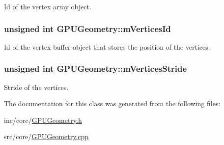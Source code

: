 Id of the vertex array object. 

\hypertarget{class_g_p_u_geometry_aec622b7cb70bdcbbe9fd124313caa4ba}{
\subsubsection[{m\+Vertices\+Id}]{\setlength{\rightskip}{0pt plus 5cm}unsigned int G\+P\+U\+Geometry\+::m\+Vertices\+Id\hspace{0.3cm}{\ttfamily [private]}}}\label{class_g_p_u_geometry_aec622b7cb70bdcbbe9fd124313caa4ba}


Id of the vertex buffer object that stores the position of the vertices. 

\hypertarget{class_g_p_u_geometry_a50f85b6aad31e8d9a5401c6030fbf7da}{
\subsubsection[{m\+Vertices\+Stride}]{\setlength{\rightskip}{0pt plus 5cm}unsigned int G\+P\+U\+Geometry\+::m\+Vertices\+Stride\hspace{0.3cm}{\ttfamily [private]}}}\label{class_g_p_u_geometry_a50f85b6aad31e8d9a5401c6030fbf7da}


Stride of the vertices. 



The documentation for this class was generated from the following files\+:\begin{DoxyCompactItemize}
\item 
inc/core/\hyperlink{_g_p_u_geometry_8h}{G\+P\+U\+Geometry.\+h}\item 
src/core/\hyperlink{_g_p_u_geometry_8cpp}{G\+P\+U\+Geometry.\+cpp}\end{DoxyCompactItemize}
